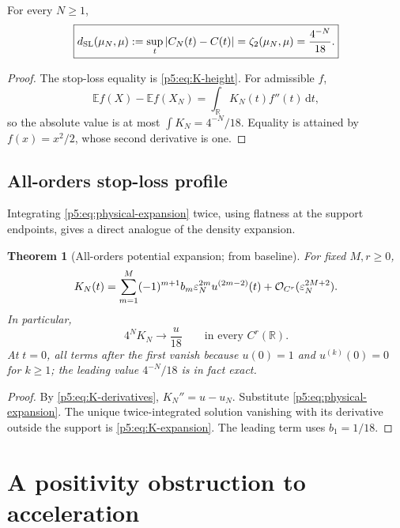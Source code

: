 \documentclass[11pt,oneside]{article}
\numberwithin{equation}{section}
\newtheorem{theorem}{Theorem}[section]
\theoremstyle{definition}
\theoremstyle{remark}
\newcommand{\R}{\mathbb R}
\newcommand{\E}{\mathbb E}
\newcommand{\dd}{\,\mathrm d}
\newcommand{\bigO}{\mathcal O}
\begin{document}
\begin{corollary}
For every $N\ge1$,
\begin{equation}
 \boxed{
 d_{\rm SL}(\mu_N,\mu):=\sup_t\left\lvert C_N(t)-C(t)\right\rvert
 =\zeta_2(\mu_N,\mu)
 =\frac{4^{-N}}{18}.}
 \label{p5:eq:sl-zeta}
\end{equation}
\end{corollary}

\begin{proof}
The stop-loss equality is \eqref{p5:eq:K-height}.  For admissible $f$,
\[
 \E f(X)-\E f(X_N)=\int_{\R}K_N(t)f''(t)\dd t,
\]
so the absolute value is at most $\int K_N=4^{-N}/18$.  Equality is attained by $f(x)=x^2/2$, whose second derivative is one.
\end{proof}

\subsection{All-orders stop-loss profile}

Integrating \eqref{p5:eq:physical-expansion} twice, using flatness at the support endpoints, gives a direct analogue of the density expansion.

\begin{theorem}[All-orders potential expansion; \newresult from baseline]
For fixed $M,r\ge0$,
\begin{equation}
 K_N(t)=\sum_{m=1}^{M}(-1)^{m+1}b_m\eps_N^{2m}u^{(2m-2)}(t)
 +\bigO_{C^r}(\eps_N^{2M+2}).
 \label{p5:eq:K-expansion}
\end{equation}
In particular,
\begin{equation}
 4^NK_N\longrightarrow\frac{u}{18}
 \qquad\text{in every }C^r(\R).
 \label{p5:eq:K-leading}
\end{equation}
At $t=0$, all terms after the first vanish because $u(0)=1$ and $u^{(k)}(0)=0$ for $k\ge1$; the leading value $4^{-N}/18$ is in fact exact.
\end{theorem}

\begin{proof}
By \eqref{p5:eq:K-derivatives}, $K_N''=u-u_N$.  Substitute \eqref{p5:eq:physical-expansion}.  The unique twice-integrated solution vanishing with its derivative outside the support is \eqref{p5:eq:K-expansion}.  The leading term uses $b_1=1/18$.
\end{proof}

\section{A positivity obstruction to acceleration}
\label{p5:sec:no-go}
\end{document}
